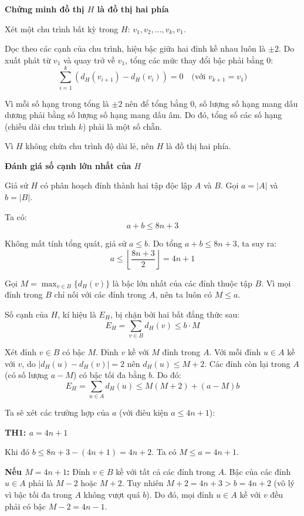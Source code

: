 \documentclass[12pt,a4paper]{article}
\theoremstyle{definition}
\begin{document}
\textbf{Chứng minh đồ thị $H$ là đồ thị hai phía}

Xét một chu trình bất kỳ trong $H$: $v_1, v_2, \dots, v_k, v_1$.

Dọc theo các cạnh của chu trình, hiệu bậc giữa hai đỉnh kề nhau luôn là $\pm 2$. Do xuất phát từ $v_1$ và quay trở về $v_1$, tổng các mức thay đổi bậc phải bằng $0$:
\[
\sum_{i=1}^{k} (d_H(v_{i+1}) - d_H(v_i)) = 0 \quad \text{(với } v_{k+1} = v_1\text{)}
\]

Vì mỗi số hạng trong tổng là $\pm 2$ nên để tổng bằng $0$, số lượng số hạng mang dấu dương phải bằng số lượng số hạng mang dấu âm. Do đó, tổng số các số hạng (chiều dài chu trình $k$) phải là một số chẵn.

Vì $H$ không chứa chu trình độ dài lẻ, nên $H$ là đồ thị hai phía.

\textbf{Đánh giá số cạnh lớn nhất của $H$}

Giả sử $H$ có phân hoạch đỉnh thành hai tập độc lập $A$ và $B$. Gọi $a = |A|$ và $b = |B|$.

Ta có:
\[
a + b \le 8n + 3
\]

Không mất tính tổng quát, giả sử $a \le b$. Do tổng $a+b \le 8n+3$, ta suy ra:
\[
a \le \left\lfloor \frac{8n+3}{2} \right\rfloor = 4n + 1
\]

Gọi $M = \max_{v \in B} \{d_H(v)\}$ là bậc lớn nhất của các đỉnh thuộc tập $B$. Vì mọi đỉnh trong $B$ chỉ nối với các đỉnh trong $A$, nên ta luôn có $M \le a$.

Số cạnh của $H$, kí hiệu là $E_H$, bị chặn bởi hai bất đẳng thức sau:
\[
E_H = \sum_{v \in B} d_H(v) \le b \cdot M
\]

Xét đỉnh $v \in B$ có bậc $M$. Đỉnh $v$ kề với $M$ đỉnh trong $A$. Với mỗi đỉnh $u \in A$ kề với $v$, do $|d_H(u) - d_H(v)| = 2$ nên $d_H(u) \le M + 2$. Các đỉnh còn lại trong $A$ (có số lượng $a - M$) có bậc tối đa bằng $b$. Do đó:
\[
E_H = \sum_{u \in A} d_H(u) \le M(M+2) + (a-M)b
\]

Ta sẽ xét các trường hợp của $a$ (với điêu kiện $a \le 4n+1$):

\textbf{TH1: $a = 4n+1$}

Khi đó $b \le 8n+3 - (4n+1) = 4n+2$. Ta có $M \le a = 4n+1$.

\textbf{Nếu $M = 4n+1$:} Đỉnh $v \in B$ kề với tất cả các đỉnh trong $A$. Bậc của các đỉnh $u \in A$ phải là $M-2$ hoặc $M+2$. Tuy nhiên $M+2 = 4n+3 > b = 4n+2$ (vô lý vì bậc tối đa trong $A$ không vượt quá $b$). Do đó, mọi đỉnh $u \in A$ kề với $v$ đều phải có bậc $M-2 = 4n-1$.
\end{document}
